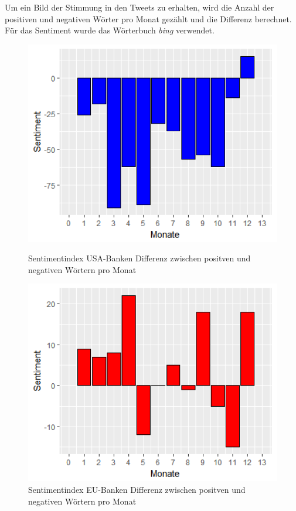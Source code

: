 Um ein Bild der Stimmung in den Tweets zu erhalten, wird die Anzahl der positiven und negativen Wörter pro Monat gezählt und die Differenz berechnet. Für das Sentiment wurde das Wörterbuch \textit{bing} verwendet.
\begin{figure}[H]
	\begin{minipage}[b]{.4\linewidth} %
	\includegraphics[width=1\textwidth]{Pictures/Monatusa.png}
	\caption{Sentimentindex USA-Banken Differenz  zwischen positven und negativen Wörtern pro Monat}\label{usadiff}
	
\end{minipage}
	\hspace{.2\linewidth}
\begin{minipage}[b]{.4\linewidth} %
	\includegraphics[width=1\textwidth]{Pictures/Monateu.png}
	\caption{Sentimentindex EU-Banken Differenz  zwischen positven und negativen Wörtern pro Monat}\label{eudiff}
\end{minipage}
\end{figure}
